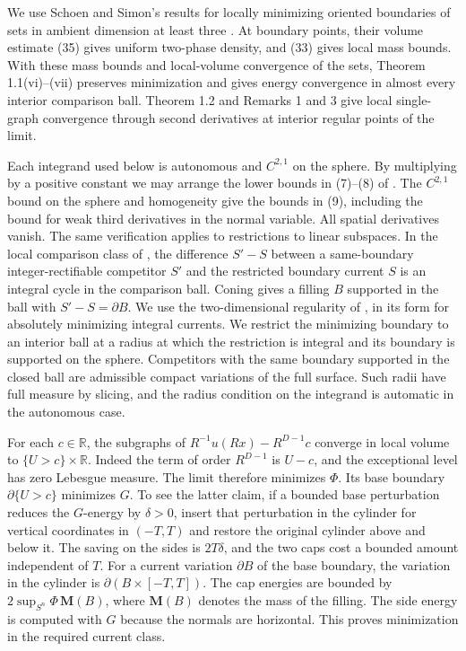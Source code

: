 \documentclass[11pt]{amsart}
\begin{document}
We use Schoen and Simon's results for locally minimizing oriented
boundaries of sets in ambient dimension at least three \cite[Part~I]{SSA}.
At boundary points, their volume estimate (35) gives uniform two-phase
density, and (33) gives local mass bounds. With these mass bounds and
local-volume convergence of the sets, Theorem 1.1(vi)--(vii) preserves
minimization and gives energy convergence in almost every interior comparison
ball. Theorem 1.2 and Remarks 1 and 3 give local single-graph
convergence through second derivatives at interior regular points of the limit.

Each integrand used below is autonomous and \(C^{2,1}\) on the sphere. By
multiplying by a positive constant we may arrange the lower bounds in
(7)--(8) of \cite[Part~I]{SSA}. The \(C^{2,1}\) bound on the
sphere and homogeneity give the bounds in (9), including the bound
for weak third derivatives in the normal variable. All
spatial derivatives vanish. The same verification applies to
restrictions to linear subspaces. In the local comparison class
of \cite[Part~I, Section~1.1]{SSA}, the difference \(S'-S\) between a
same-boundary integer-rectifiable competitor \(S'\) and the restricted
boundary current \(S\) is an integral cycle in the comparison ball.
Coning gives a filling \(B\) supported in the ball with
\(S'-S=\partial B\). We use the two-dimensional regularity of
\cite[Part~I, Corollary~3.2 and the following remark]{SSA}, in its
form for absolutely minimizing integral currents. We restrict the
minimizing boundary to an interior ball at a radius at which the restriction
is integral and its boundary is supported on the sphere. Competitors with
the same boundary supported in the closed ball are admissible compact
variations of the full surface. Such radii have full measure by slicing,
and the radius condition on the integrand is automatic in the autonomous
case.

For each \(c\in\mathbb R\), the subgraphs of
\(R^{-1}u(Rx)-R^{D-1}c\) converge in local volume to
\(\{U>c\}\times\mathbb R\). Indeed the term of order \(R^{D-1}\) is
\(U-c\), and the exceptional level has zero Lebesgue measure. The limit
therefore minimizes \(\Phi\). Its base boundary \(\partial\{U>c\}\)
minimizes \(G\). To see the latter claim, if a bounded base perturbation
reduces the \(G\)-energy by \(\delta>0\), insert that perturbation in the
cylinder for vertical coordinates in \((-T,T)\) and restore the
original cylinder above and below it. The saving on the sides is
\(2T\delta\), and the two caps cost a bounded amount independent of
\(T\). For a current variation \(\partial B\) of the base boundary,
the variation in the cylinder is \(\partial(B\times[-T,T])\).
The cap energies are bounded by \(2\sup_{S^n}\Phi\,\mathbf M(B)\),
where \(\mathbf M(B)\) denotes the mass of the filling. The side energy
is computed with \(G\) because the normals are horizontal. This proves
minimization in the required current class.
\end{document}
